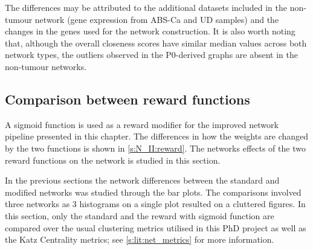 The differences may be attributed to the additional datasets included in the non-tumour network (gene expression from ABS-Ca and UD samples) and the changes in the genes used for the network construction. It is also worth noting that, although the overall closeness scores have similar median values across both network types, the outliers observed in the P0-derived graphs are absent in the non-tumour networks.


\subsection{Comparison between reward functions} \label{s:N_II:reward_comp}

A sigmoid function is used as a reward modifier for the improved network pipeline presented in this chapter. The differences in how the weights are changed by the two functions is shown in \cref{s:N_II:reward}. The networks effects of the two reward functions on the network is studied in this section.

In the previous sections the network differences between the standard and modified networks was studied through the bar plots. The comparisons involved three networks as 3 histograms on a single plot resulted on a cluttered figures. In this section, only the standard and the reward with sigmoid function are compared over the usual clustering metrics utilised in this PhD project as well as the Katz Centrality metrics; see \cref{s:lit:net_metrics} for more information.


